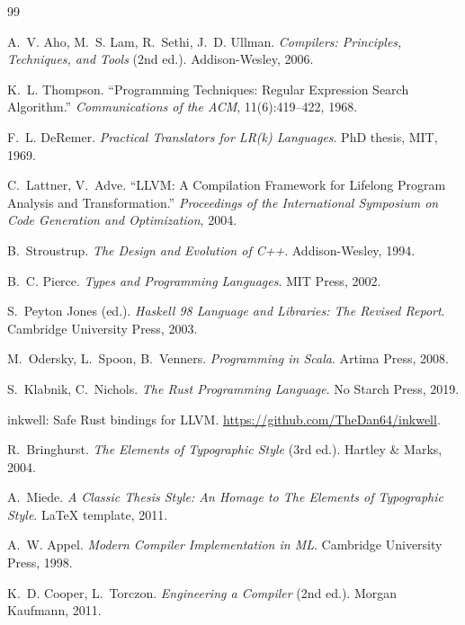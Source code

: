\documentclass[11pt,a4paper,oneside,openany]{report}
\begin{document}
\begin{thebibliography}{99}

A.~V. Aho, M.~S. Lam, R.~Sethi, J.~D. Ullman.
\textit{Compilers: Principles, Techniques, and Tools} (2nd ed.).
Addison-Wesley, 2006.

K.~L. Thompson.
``Programming Techniques: Regular Expression Search Algorithm.''
\textit{Communications of the ACM}, 11(6):419--422, 1968.

F.~L. DeRemer.
\textit{Practical Translators for LR(k) Languages}.
PhD thesis, MIT, 1969.

C.~Lattner, V.~Adve.
``LLVM: A Compilation Framework for Lifelong Program Analysis and Transformation.''
\textit{Proceedings of the International Symposium on Code Generation and
Optimization}, 2004.

B.~Stroustrup.
\textit{The Design and Evolution of C++}.
Addison-Wesley, 1994.

B.~C. Pierce.
\textit{Types and Programming Languages}.
MIT Press, 2002.

S.~Peyton Jones (ed.).
\textit{Haskell 98 Language and Libraries: The Revised Report}.
Cambridge University Press, 2003.

M.~Odersky, L.~Spoon, B.~Venners.
\textit{Programming in Scala}.
Artima Press, 2008.

S.~Klabnik, C.~Nichols.
\textit{The Rust Programming Language}.
No Starch Press, 2019.

inkwell: Safe Rust bindings for LLVM.
\url{https://github.com/TheDan64/inkwell}.

R.~Bringhurst.
\textit{The Elements of Typographic Style} (3rd ed.).
Hartley \& Marks, 2004.

A.~Miede.
\textit{A Classic Thesis Style: An Homage to The Elements of Typographic Style}.
LaTeX template, 2011.

A.~W. Appel.
\textit{Modern Compiler Implementation in ML}.
Cambridge University Press, 1998.

K.~D. Cooper, L.~Torczon.
\textit{Engineering a Compiler} (2nd ed.).
Morgan Kaufmann, 2011.


\end{thebibliography}
\end{document}

